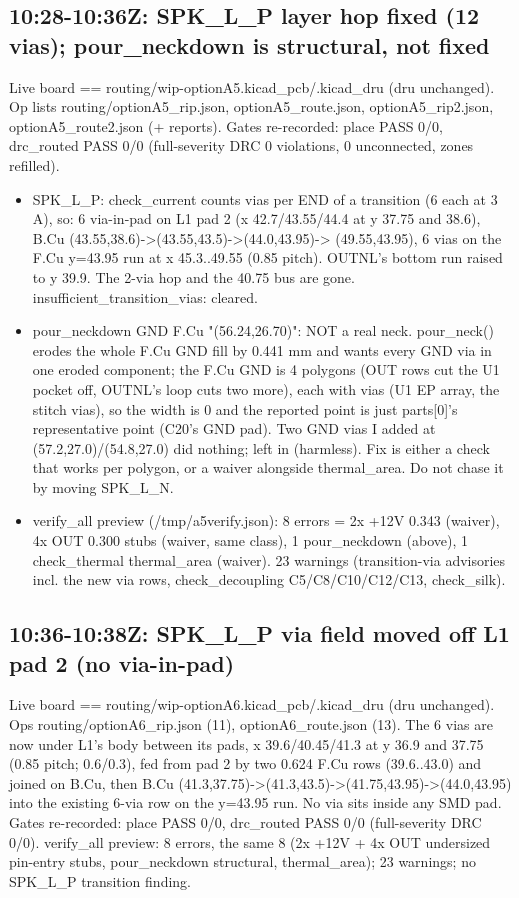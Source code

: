 \documentclass[11pt]{article}
\begin{document}
\subsection*{10:28-10:36Z: SPK\_L\_P layer hop fixed (12 vias); pour\_neckdown is structural, not fixed}
Live board == routing/wip-optionA5.kicad\_pcb/.kicad\_dru (dru unchanged). Op lists routing/optionA5\_rip.json, optionA5\_route.json, optionA5\_rip2.json, optionA5\_route2.json (+ reports). Gates re-recorded: place PASS 0/0, drc\_routed PASS 0/0 (full-severity DRC 0 violations, 0 unconnected, zones refilled).

\begin{itemize}
\item SPK\_L\_P: check\_current counts vias per END of a transition (6 each at 3 A), so: 6 via-in-pad on
L1 pad 2 (x 42.7/43.55/44.4 at y 37.75 and 38.6), B.Cu (43.55,38.6)-\textgreater{}(43.55,43.5)-\textgreater{}(44.0,43.95)-\textgreater{}
(49.55,43.95), 6 vias on the F.Cu y=43.95 run at x 45.3..49.55 (0.85 pitch). OUTNL's bottom run
raised to y 39.9. The 2-via hop and the 40.75 bus are gone. insufficient\_transition\_vias: cleared.
\item pour\_neckdown GND F.Cu "(56.24,26.70)": NOT a real neck. pour\_neck() erodes the whole F.Cu GND
fill by 0.441 mm and wants every GND via in one eroded component; the F.Cu GND is 4 polygons
(OUT rows cut the U1 pocket off, OUTNL's loop cuts two more), each with vias (U1 EP array, the
stitch vias), so the width is 0 and the reported point is just parts{[}0{]}'s representative point
(C20's GND pad). Two GND vias I added at (57.2,27.0)/(54.8,27.0) did nothing; left in (harmless).
Fix is either a check that works per polygon, or a waiver alongside thermal\_area. Do not chase it
by moving SPK\_L\_N.
\item verify\_all preview (/tmp/a5verify.json): 8 errors = 2x +12V 0.343 (waiver), 4x OUT 0.300 stubs
(waiver, same class), 1 pour\_neckdown (above), 1 check\_thermal thermal\_area (waiver). 23 warnings
(transition-via advisories incl. the new via rows, check\_decoupling C5/C8/C10/C12/C13, check\_silk).
\end{itemize}
\subsection*{10:36-10:38Z: SPK\_L\_P via field moved off L1 pad 2 (no via-in-pad)}
Live board == routing/wip-optionA6.kicad\_pcb/.kicad\_dru (dru unchanged). Ops routing/optionA6\_rip.json (11), optionA6\_route.json (13). The 6 vias are now under L1's body between its pads, x 39.6/40.45/41.3 at y 36.9 and 37.75 (0.85 pitch; 0.6/0.3), fed from pad 2 by two 0.624 F.Cu rows (39.6..43.0) and joined on B.Cu, then B.Cu (41.3,37.75)-\textgreater{}(41.3,43.5)-\textgreater{}(41.75,43.95)-\textgreater{}(44.0,43.95) into the existing 6-via row on the y=43.95 run. No via sits inside any SMD pad. Gates re-recorded: place PASS 0/0, drc\_routed PASS 0/0 (full-severity DRC 0/0). verify\_all preview: 8 errors, the same 8 (2x +12V + 4x OUT undersized pin-entry stubs, pour\_neckdown structural, thermal\_area); 23 warnings; no SPK\_L\_P transition finding.
\end{document}
